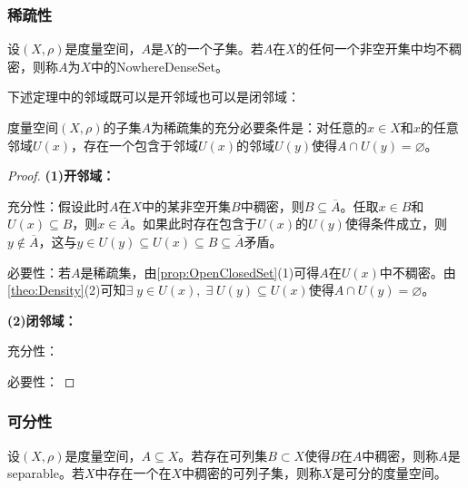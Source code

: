 \subsubsection{稀疏性}
\begin{definition}
	设$(X,\rho)$是度量空间，$A$是$X$的一个子集。若$A$在$X$的任何一个非空开集中均不稠密，则称$A$为$X$中的\gls{NowhereDenseSet}。
\end{definition}
下述定理中的邻域既可以是开邻域也可以是闭邻域：
\begin{theorem}
	度量空间$(X,\rho)$的子集$A$为稀疏集的充分必要条件是：对任意的$x\in X$和$x$的任意邻域$U(x)$，存在一个包含于邻域$U(x)$的邻域$U(y)$使得$A\cap U(y)=\varnothing$。
\end{theorem}
\begin{proof}
	\textbf{(1)开邻域：}\par
	充分性：假设此时$A$在$X$中的某非空开集$B$中稠密，则$B\subseteq\overline{A}$。任取$x\in B$和$U(x)\subseteq B$，则$x\in\overline{A}$。如果此时存在包含于$U(x)$的$U(y)$使得条件成立，则$y\notin\overline{A}$，这与$y\in U(y)\subseteq U(x)\subseteq B\subseteq\overline{A}$矛盾。\par
	必要性：若$A$是稀疏集，由\cref{prop:OpenClosedSet}(1)可得$A$在$U(x)$中不稠密。由\cref{theo:Density}(2)可知$\exists\;y\in U(x),\;\exists\;U(y)\subseteq U(x)$使得$A\cap U(y)=\varnothing$。\par
	\textbf{(2)闭邻域：}\par
	充分性：\par
	必要性：
\end{proof}
\subsubsection{可分性}
\begin{definition}
	设$(X,\rho)$是度量空间，$A\subseteq X$。若存在可列集$B\subset X$使得$B$在$A$中稠密，则称$A$是\gls{separable}。若$X$中存在一个在$X$中稠密的可列子集，则称$X$是可分的度量空间。
\end{definition}

